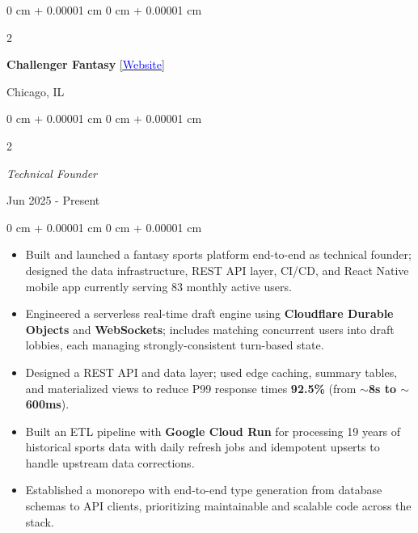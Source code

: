\documentclass[10pt, letterpaper]{article}
\newenvironment{highlights}{
		\begin{itemize}[
        topsep=0.10 cm,
        parsep=0.10 cm,
        partopsep=0pt,
        itemsep=0pt,
        leftmargin=0 cm + 10pt
						]
				}{
		\end{itemize}
} %
\newenvironment{onecolentry}{
		\begin{adjustwidth}{
						0 cm + 0.00001 cm
    }{
						0 cm + 0.00001 cm
    }
		}{
		\end{adjustwidth}
} %
\newenvironment{twocolentry}[2][]{
		\onecolentry
		\def\secondColumn{#2}
		\setcolumnwidth{\fill, 4.5 cm}
		\begin{paracol}{2}
		}{
    \switchcolumn \raggedleft \secondColumn
		\end{paracol}
		\endonecolentry
} %
\let\hrefWithoutArrow\href
\begin{document}
\begin{twocolentry}{Chicago, IL}
		\textbf{Challenger Fantasy}
		\hrefWithoutArrow{https://challengerfantasy.com}{[\textcolor{blue}{Website}]}
\end{twocolentry}
\begin{twocolentry}{Jun 2025 - Present}
		\textit{Technical Founder}
\end{twocolentry}
\vspace{0.10 cm}
\begin{onecolentry}
		\begin{highlights}
		\item Built and launched a fantasy sports platform end-to-end as technical founder;
				designed the data infrastructure, REST API layer, CI/CD, and React Native mobile app
				currently serving 83 monthly active users.
		\item Engineered a serverless real-time draft engine using \textbf{Cloudflare Durable
				Objects} and \textbf{WebSockets}; includes matching concurrent users into draft
				lobbies, each managing strongly-consistent turn-based state.
		\item Designed a REST API and data layer; used edge caching, summary tables, and
				materialized views to reduce P99 response times \textbf{92.5\%} (from
				\textbf{$\sim$8s to $\sim$600ms}).
		\item Built an ETL pipeline with \textbf{Google Cloud Run} for processing 19 years of
				historical sports data with daily refresh jobs and idempotent upserts to handle
				upstream data corrections.
		\item Established a monorepo with end-to-end type generation from database schemas to
				API clients, prioritizing maintainable and scalable code across the stack.
		\end{highlights}
\end{onecolentry}

\vspace{0.15 cm}
\end{document}
